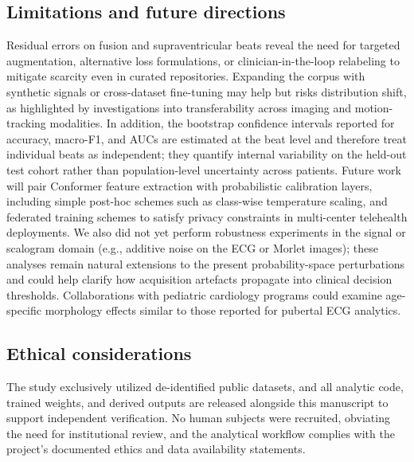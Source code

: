 \subsection{Limitations and future directions}
Residual errors on fusion and supraventricular beats reveal the need for targeted augmentation, alternative loss formulations, or clinician-in-the-loop relabeling to mitigate scarcity even in curated repositories. Expanding the corpus with synthetic signals or cross-dataset fine-tuning may help but risks distribution shift, as highlighted by investigations into transferability across imaging and motion-tracking modalities.\cite{thapa2025generalizable,jenifer2024yolo} In addition, the bootstrap confidence intervals reported for accuracy, macro-F1, and AUCs are estimated at the beat level and therefore treat individual beats as independent; they quantify internal variability on the held-out test cohort rather than population-level uncertainty across patients. Future work will pair Conformer feature extraction with probabilistic calibration layers, including simple post-hoc schemes such as class-wise temperature scaling, and federated training schemes to satisfy privacy constraints in multi-center telehealth deployments. We also did not yet perform robustness experiments in the signal or scalogram domain (e.g., additive noise on the ECG or Morlet images); these analyses remain natural extensions to the present probability-space perturbations and could help clarify how acquisition artefacts propagate into clinical decision thresholds. Collaborations with pediatric cardiology programs could examine age-specific morphology effects similar to those reported for pubertal ECG analytics.\cite{spagna2024telecardiology}

\subsection{Ethical considerations}
The study exclusively utilized de-identified public datasets, and all analytic code, trained weights, and derived outputs are released alongside this manuscript to support independent verification. No human subjects were recruited, obviating the need for institutional review, and the analytical workflow complies with the project’s documented ethics and data availability statements.


